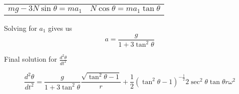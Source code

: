 \documentclass[11pt]{article}
\begin{document}
\begin{enumerate}
          \begin{center}
              \begin{tabular}{p{5cm}p{5cm}}
                  \begin{equation}
                      mg-3N\sin\theta=ma_1
                  \end{equation}
                   &
                  \begin{equation}
                      N\cos\theta=ma_1\tan\theta
                  \end{equation}
              \end{tabular}
          \end{center}

          Solving for $a_1$ gives us
          \begin{equation}
              a=\frac{g}{1+3 \tan^2 \theta}
          \end{equation}

          Final solution for $\frac{d^2\theta}{dt^2}$

          \begin{equation}
              \boxed{
              \frac{d^2\theta}{dt^2}=\frac{g}{1+3 \tan^2 \theta}\frac{\sqrt{\tan^2\theta-1}}{r}+\frac{1}{2} (\tan^2\theta-1)^{-\frac{1}{2}}2 \sec^2 \theta \tan \theta r\omega^2}
          \end{equation}

\end{enumerate}
\end{document}
